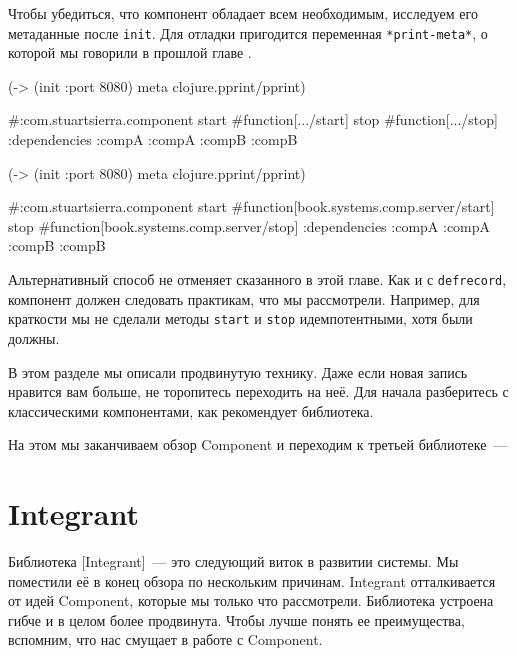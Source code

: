 \fi

Чтобы убедиться, что компонент обладает всем необходимым, исследуем его
метаданные после \verb|init|. Для отладки пригодится переменная
\verb|*print-meta*|, о которой мы говорили в прошлой главе .

\ifnarrow

\begin{english}
  \begin{clojure}
(-> (init {:port 8080})
    meta
    clojure.pprint/pprint)

#:com.stuartsierra.component
 {start #function[.../start]
  stop  #function[.../stop]
  :dependencies
  {:compA :compA :compB :compB}}
  \end{clojure}
\end{english}

\else

\begin{english}
  \begin{clojure}
(-> (init {:port 8080})
    meta
    clojure.pprint/pprint)

#:com.stuartsierra.component
  {start #function[book.systems.comp.server/start]
   stop #function[book.systems.comp.server/stop]
   :dependencies {:compA :compA :compB :compB}}
  \end{clojure}
\end{english}

\fi


Альтернативный способ не отменяет сказанного в этой главе. Как и с
\verb|defrecord|, компонент должен следовать практикам, что мы
рассмотрели. Например, для краткости мы не сделали методы \verb|start| и
\verb|stop| идемпотентными, хотя были должны.

В этом разделе мы описали продвинутую технику. Даже если новая запись нравится
вам больше, не торопитесь переходить на неё. Для начала разберитесь с
классическими компонентами, как рекомендует библиотека.

На этом мы заканчиваем обзор Component и переходим к третьей библиотеке~---

\section{Integrant}


Библиотека [Integrant]~--- это
следующий виток в развитии системы. Мы поместили её в конец обзора по нескольким
причинам. Integrant отталкивается от идей Component, которые мы только что
рассмотрели. Библиотека устроена гибче и в целом более продвинута. Чтобы лучше
понять ее преимущества, вспомним, что нас смущает в работе с Component.

